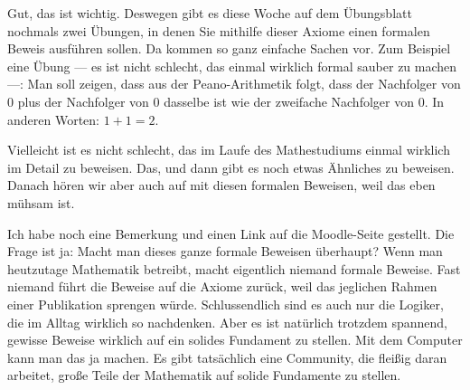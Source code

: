 \begin{spoken-clean}[00:14:48 - 00:17:30]
Gut, das ist wichtig. Deswegen gibt es diese Woche auf dem Übungsblatt nochmals zwei Übungen, in denen Sie mithilfe dieser Axiome einen formalen Beweis ausführen sollen. Da kommen so ganz einfache Sachen vor. Zum Beispiel eine Übung --- es ist nicht schlecht, das einmal wirklich formal sauber zu machen ---: Man soll zeigen, dass aus der Peano-Arithmetik folgt, dass der Nachfolger von $0$ plus der Nachfolger von $0$ dasselbe ist wie der zweifache Nachfolger von $0$. In anderen Worten: $1 + 1 = 2$.

Vielleicht ist es nicht schlecht, das im Laufe des Mathestudiums einmal wirklich im Detail zu beweisen. Das, und dann gibt es noch etwas Ähnliches zu beweisen. Danach hören wir aber auch auf mit diesen formalen Beweisen, weil das eben mühsam ist.

Ich habe noch eine Bemerkung und einen Link auf die Moodle-Seite gestellt. Die Frage ist ja: Macht man dieses ganze formale Beweisen überhaupt? Wenn man heutzutage Mathematik betreibt, macht eigentlich niemand formale Beweise. Fast niemand führt die Beweise auf die Axiome zurück, weil das jeglichen Rahmen einer Publikation sprengen würde. Schlussendlich sind es auch nur die Logiker, die im Alltag wirklich so nachdenken. Aber es ist natürlich trotzdem spannend, gewisse Beweise wirklich auf ein solides Fundament zu stellen. Mit dem Computer kann man das ja machen. Es gibt tatsächlich eine Community, die fleißig daran arbeitet, große Teile der Mathematik auf solide Fundamente zu stellen.
\end{spoken-clean}

